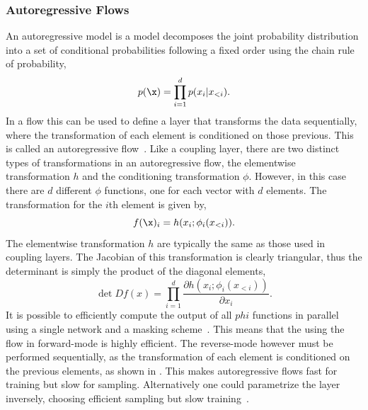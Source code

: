 \subsubsection{Autoregressive Flows}

An autoregressive model is a model decomposes the joint probability distribution into a set of conditional probabilities following a fixed order using the chain rule of probability,
\begin{equation}
    p(\x) = \prod_{i=1}^d p(x_i | x_{<i}).
\end{equation}
In a flow this can be used to define a layer that transforms the data sequentially, where the transformation of each element is conditioned on those previous.
This is called an autoregressive flow~\cite{MaskedAutoregressiveFlow}.
Like a coupling layer, there are two distinct types of transformations in an autoregressive flow, the elementwise transformation $h$ and the conditioning transformation $\phi$.
However, in this case there are $d$ different $\phi$ functions, one for each vector with $d$ elements.
The transformation for the $i$th element is given by,
\begin{equation}
    \label{eq:autoregressive_flow}
    f(\x)_i = h(x_i; \phi_i(x_{<i})).
\end{equation}
The elementwise transformation $h$ are typically the same as those used in coupling layers.
The Jacobian of this transformation is clearly triangular, thus the determinant is simply the product of the diagonal elements,
\begin{equation}
    \det D f(x) = \prod_{i=1}^d \frac{\partial h(x_i; \phi_i(x_{<i}))}{\partial x_i}.
\end{equation}
It is possible to efficiently compute the output of all $phi$ functions in parallel using a single network and a masking scheme~\cite{MADEMaskedAutoencoder}.
This means that the using the flow in forward-mode is highly efficient.
The reverse-mode however must be performed sequentially, as the transformation of each element is conditioned on the previous elements, as shown in .
This makes autoregressive flows fast for training but slow for sampling.
Alternatively one could parametrize the layer inversely, choosing efficient sampling but slow training~\cite{ImprovingVariationalInference}.

